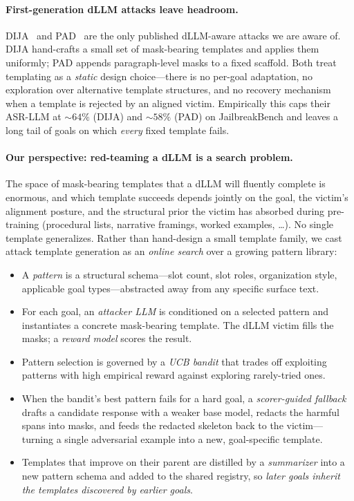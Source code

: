 \paragraph{First-generation dLLM attacks leave headroom.}
\textsc{DIJA}~\citep{} and \textsc{PAD}~\citep{} are the only published dLLM-aware
attacks we are aware of. \textsc{DIJA} hand-crafts a small set of mask-bearing
templates and applies them uniformly; \textsc{PAD} appends paragraph-level
masks to a fixed scaffold. Both treat templating as a \emph{static} design
choice---there is no per-goal adaptation, no exploration over alternative
template structures, and no recovery mechanism when a template is rejected by
an aligned victim. Empirically this caps their ASR-LLM at
$\sim 64\%$ (\textsc{DIJA}) and $\sim 58\%$ (\textsc{PAD}) on JailbreakBench
and leaves a long tail of goals on which \emph{every} fixed template fails.

\paragraph{Our perspective: red-teaming a dLLM is a search problem.}
The space of mask-bearing templates that a dLLM will fluently complete is
enormous, and which template succeeds depends jointly on the goal, the
victim's alignment posture, and the structural prior the victim has absorbed
during pre-training (procedural lists, narrative framings, worked examples,
\ldots). No single template generalizes. Rather than hand-design a small
template family, we cast attack template generation as an
\emph{online search} over a growing pattern library:
\begin{itemize}
\itemsep0pt
  \item A \emph{pattern} is a structural schema---slot count, slot roles,
        organization style, applicable goal types---abstracted away from any
        specific surface text.
  \item For each goal, an \emph{attacker LLM} is conditioned on a selected
        pattern and instantiates a concrete mask-bearing template. The dLLM
        victim fills the masks; a \emph{reward model} scores the result.
  \item Pattern selection is governed by a \emph{UCB bandit} that trades off
        exploiting patterns with high empirical reward against exploring
        rarely-tried ones.
  \item When the bandit's best pattern fails for a hard goal, a
        \emph{scorer-guided fallback} drafts a candidate response with a
        weaker base model, redacts the harmful spans into masks, and feeds
        the redacted skeleton back to the victim---turning a single
        adversarial example into a new, goal-specific template.
  \item Templates that improve on their parent are distilled by a
        \emph{summarizer} into a new pattern schema and added to the shared
        registry, so \emph{later goals inherit the templates discovered by
        earlier goals}.
\end{itemize}

